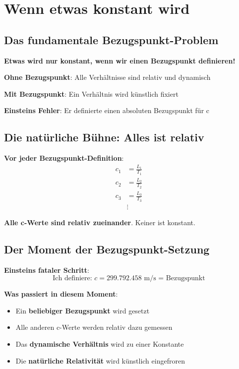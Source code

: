 \documentclass[12pt,a4paper]{article}
\begin{document}
	\section{Wenn etwas konstant wird}
	
	\subsection{Das fundamentale Bezugspunkt-Problem}
	
	\begin{tcolorbox}[colback=red!5!white,colframe=red!75!black,title=Die Bezugspunkt-Illusion]
		\textbf{Etwas wird nur konstant, wenn wir einen Bezugspunkt definieren!}
		
		\textbf{Ohne Bezugspunkt}: Alle Verhältnisse sind relativ und dynamisch
		
		\textbf{Mit Bezugspunkt}: Ein Verhältnis wird künstlich fixiert
		
		\textbf{Einsteins Fehler}: Er definierte einen absoluten Bezugspunkt für c
	\end{tcolorbox}
	
	\subsection{Die natürliche Bühne: Alles ist relativ}
	
	\textbf{Vor jeder Bezugspunkt-Definition}:
	\begin{align}
		c_1 &= \frac{L_1}{T_1} \\
		c_2 &= \frac{L_2}{T_2} \\
		c_3 &= \frac{L_3}{T_3} \\
		&\vdots
	\end{align}
	
	\textbf{Alle c-Werte sind relativ zueinander}. Keiner ist konstant.
	
	\subsection{Der Moment der Bezugspunkt-Setzung}
	
	\textbf{Einsteins fataler Schritt}:
	\begin{equation}
		\text{Ich definiere: } c = 299.792.458 \text{ m/s = Bezugspunkt}
	\end{equation}
	
	\textbf{Was passiert in diesem Moment}:
	\begin{itemize}
		\item Ein \textbf{beliebiger Bezugspunkt} wird gesetzt
		\item Alle anderen c-Werte werden relativ dazu gemessen
		\item Das \textbf{dynamische Verhältnis} wird zu einer Konstante
		\item Die \textbf{natürliche Relativität} wird künstlich eingefroren
	\end{itemize}
	
\end{document}
